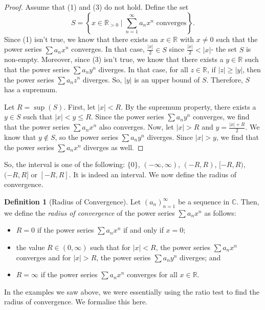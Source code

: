 \documentclass[a4paper, openany]{memoir}
\theoremstyle{definition}
\newtheorem{definition}{Definition}[section]
\theoremstyle{plain}
\begin{document}
\begin{proof}
Assume that (1) and (3) do not hold. Define the set
\[S = \left\{x \in \mathbb{R}_{> 0} \mid \sum_{n=1}^{\infty} a_n x^n \text{ converges}\right\}.\]
Since (1) isn't true, we know that there exists an $x \in \mathbb{R}$ with $x \neq 0$ such that the power series $\sum a_n x^n$ converges. In that case, $\frac{|x|}{2} \in S$ since $\frac{|x|}{2} < |x|$- the set $S$ is non-empty. Moreover, since (3) isn't true, we know that there exists a $y \in \mathbb{R}$ such that the power series $\sum a_n y^n$ diverges. In that case, for all $z \in \mathbb{R}$, if $|z| \geqslant |y|$, then the power series $\sum a_n z^n$ diverges. So, $|y|$ is an upper bound of $S$. Therefore, $S$ has a supremum.

\noindent Let $R = \sup (S)$. First, let $|x| < R$. By the supremum property, there exists a $y \in S$ such that $|x| < y \leqslant R$. Since the power series $\sum a_n y^n$ converges, we find that the power series $\sum a_n x^n$ also converges. Now, let $|x| > R$ and $y = \frac{|x| + R}{2}$. We know that $y \not\in S$, so the power series $\sum a_n y^n$ diverges. Since $|x| > y$, we find that the power series $\sum a_n x^n$ diverges as well.
\end{proof}
\noindent So, the interval is one of the following: $\{0\}$, $(-\infty, \infty)$, $(-R, R)$, $[-R, R)$, $(-R, R]$ or $[-R, R]$. It is indeed an interval. We now define the radius of convergence.
\begin{definition}[Radius of Convergence]
Let $(a_n)_{n=1}^{\infty}$ be a sequence in $\mathbb{C}$. Then, we define the \emph{radius of convergence} of the power series $\sum a_n x^n$ as follows:
\begin{itemize}
    \item $R = 0$ if the power series $\sum a_n x^n$ if and only if $x = 0$;
    \item the value $R \in (0, \infty)$ such that for $|x| < R$, the power series $\sum a_n x^n$ converges and for $|x| > R$, the power series $\sum a_n y^n$ diverges; and
    \item $R = \infty$ if the power series $\sum a_n x^n$ converges for all $x \in \mathbb{R}$.
\end{itemize}
\end{definition}
In the examples we saw above, we were essentially using the ratio test to find the radius of convergence. We formalise this here.
\end{document}
